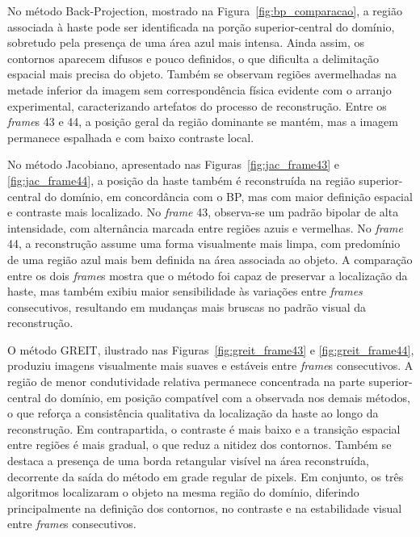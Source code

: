 No método Back-Projection, mostrado na Figura~\ref{fig:bp_comparacao}, a região associada à haste pode ser identificada na porção superior-central do domínio, sobretudo pela presença de uma área azul mais intensa. Ainda assim, os contornos aparecem difusos e pouco definidos, o que dificulta a delimitação espacial mais precisa do objeto. Também se observam regiões avermelhadas na metade inferior da imagem sem correspondência física evidente com o arranjo experimental, caracterizando artefatos do processo de reconstrução. Entre os \textit{frame}s 43 e 44, a posição geral da região dominante se mantém, mas a imagem permanece espalhada e com baixo contraste local.

No método Jacobiano, apresentado nas Figuras~\ref{fig:jac_frame43} e \ref{fig:jac_frame44}, a posição da haste também é reconstruída na região superior-central do domínio, em concordância com o BP, mas com maior definição espacial e contraste mais localizado. No \textit{frame} 43, observa-se um padrão bipolar de alta intensidade, com alternância marcada entre regiões azuis e vermelhas. No \textit{frame} 44, a reconstrução assume uma forma visualmente mais limpa, com predomínio de uma região azul mais bem definida na área associada ao objeto. A comparação entre os dois \textit{frame}s mostra que o método foi capaz de preservar a localização da haste, mas também exibiu maior sensibilidade às variações entre \textit{frames} consecutivos, resultando em mudanças mais bruscas no padrão visual da reconstrução.

O método GREIT, ilustrado nas Figuras~\ref{fig:greit_frame43} e \ref{fig:greit_frame44}, produziu imagens visualmente mais suaves e estáveis entre \textit{frame}s consecutivos. A região de menor condutividade relativa permanece concentrada na parte superior-central do domínio, em posição compatível com a observada nos demais métodos, o que reforça a consistência qualitativa da localização da haste ao longo da reconstrução. Em contrapartida, o contraste é mais baixo e a transição espacial entre regiões é mais gradual, o que reduz a nitidez dos contornos. Também se destaca a presença de uma borda retangular visível na área reconstruída, decorrente da saída do método em grade regular de pixels. Em conjunto, os três algoritmos localizaram o objeto na mesma região do domínio, diferindo principalmente na definição dos contornos, no contraste e na estabilidade visual entre \textit{frame}s consecutivos.

